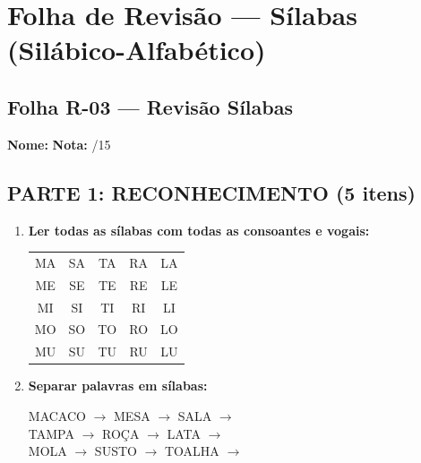 \section{Folha de Revisão --- Sílabas (Silábico-Alfabético)}


\subsection{Folha R-03 --- Revisão Sílabas}

\begin{exercicio}

\noindent\textbf{Nome:} \underline{\hspace{4cm}} \quad \textbf{Nota:} \underline{\hspace{1cm}}/15

\subsection*{PARTE 1: RECONHECIMENTO (5 itens)}

\begin{enumerate}
  \item \textbf{Ler todas as sílabas com todas as consoantes e vogais:}
  \begin{center}
  \begin{tabular}{ccccc}
  MA & SA & TA & RA & LA \\
  ME & SE & TE & RE & LE \\
  MI & SI & TI & RI & LI \\
  MO & SO & TO & RO & LO \\
  MU & SU & TU & RU & LU
  \end{tabular}
  \end{center}

  \item \textbf{Separar palavras em sílabas:}
  \begin{center}
  MACACO $\rightarrow$ \underline{\hspace{1.5cm}} \quad MESA $\rightarrow$ \underline{\hspace{1.5cm}} \quad SALA $\rightarrow$ \underline{\hspace{1.5cm}} \\
  TAMPA $\rightarrow$ \underline{\hspace{1.5cm}} \quad ROÇA $\rightarrow$ \underline{\hspace{1.5cm}} \quad LATA $\rightarrow$ \underline{\hspace{1.5cm}} \\
  MOLA $\rightarrow$ \underline{\hspace{1.5cm}} \quad SUSTO $\rightarrow$ \underline{\hspace{1.5cm}} \quad TOALHA $\rightarrow$ \underline{\hspace{1.5cm}}
  \end{center}


\end{enumerate}
\end{exercicio}
